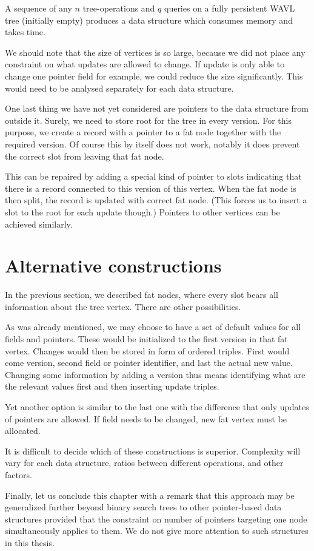 \begin{cor}
A sequence of any $n$ tree-operations and $q$ queries on a fully persistent WAVL tree (initially empty) produces a data structure which consumes  memory and takes  time.
\end{cor}

We should note that the size of vertices is so large, because we did not place any constraint on what updates are allowed to change. If update is only able to change one pointer field for example, we could reduce the size significantly. This would need to be analysed separately for each data structure.

One last thing we have not yet considered are pointers to the data structure from outside it. Surely, we need to store root for the tree in every version. For this purpose, we create a record with a pointer to a fat node together with the required version. Of course this by itself does not work, notably it does prevent the correct slot from leaving that fat node. 

This can be repaired by adding a special kind of pointer to slots indicating that there is a record  connected to this version of this vertex. When the fat node is then split, the record is updated with correct fat node. (This forces us to insert a slot to the root for each update though.) Pointers to other vertices can be achieved similarly.

\section{Alternative constructions}

In the previous section, we described fat nodes, where every slot bears all information about the tree vertex. There are other possibilities.

As was already mentioned, we may choose to have a set of default values for all fields and pointers.
These would be initialized to the first version in that fat vertex. Changes would then be stored in form of ordered triples. First would come version, second field or pointer identifier, and last the actual new value. Changing some information by adding a version thus means identifying what are the relevant values first and then inserting update triples.

Yet another option is similar to the last one with the difference that only updates of pointers are allowed. If field needs to be changed, new fat vertex must be allocated.

It is difficult to decide which of these constructions is superior. Complexity will vary for each data structure, ratios between different operations, and other factors.

Finally, let us conclude this chapter with a remark that this approach may be generalized further beyond binary search trees to other pointer-based data structures provided that the constraint on number of pointers targeting one node simultaneously applies to them.
We do not give more attention to such structures in this thesis.

